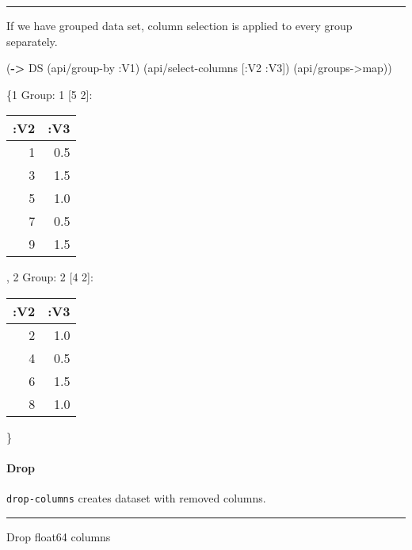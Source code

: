 \documentclass[]{article}
\newenvironment{Shaded}{\begin{snugshade}}{\end{snugshade}}
\newcommand{\KeywordTok}[1]{\textcolor[rgb]{0.13,0.29,0.53}{\textbf{#1}}}
\newcommand{\VariableTok}[1]{\textcolor[rgb]{0.00,0.00,0.00}{#1}}
\newcommand{\AttributeTok}[1]{\textcolor[rgb]{0.77,0.63,0.00}{#1}}
\newcommand{\NormalTok}[1]{#1}
\let\oldparagraph\paragraph
\renewcommand{\paragraph}[1]{\oldparagraph{#1}\mbox{}}
\begin{document}
\begin{center}\rule{0.5\linewidth}{0.5pt}\end{center}

If we have grouped data set, column selection is applied to every group
separately.

\begin{Shaded}
\begin{Highlighting}[]
\NormalTok{(}\KeywordTok{->}\NormalTok{ DS}
\NormalTok{    (api/group-by }\AttributeTok{:V1}\NormalTok{)}
\NormalTok{    (api/select-columns [}\AttributeTok{:V2} \AttributeTok{:V3}\NormalTok{])}
\NormalTok{    (api/groups->map))}
\end{Highlighting}
\end{Shaded}

\{1 Group: 1 {[}5 2{]}:

\begin{longtable}[]{@{}rr@{}}
\toprule
:V2 & :V3\tabularnewline
\midrule
\endhead
1 & 0.5\tabularnewline
3 & 1.5\tabularnewline
5 & 1.0\tabularnewline
7 & 0.5\tabularnewline
9 & 1.5\tabularnewline
\bottomrule
\end{longtable}

, 2 Group: 2 {[}4 2{]}:

\begin{longtable}[]{@{}rr@{}}
\toprule
:V2 & :V3\tabularnewline
\midrule
\endhead
2 & 1.0\tabularnewline
4 & 0.5\tabularnewline
6 & 1.5\tabularnewline
8 & 1.0\tabularnewline
\bottomrule
\end{longtable}

\}

\paragraph{Drop}\label{drop}

\texttt{drop-columns} creates dataset with removed columns.

\begin{center}\rule{0.5\linewidth}{0.5pt}\end{center}

Drop float64 columns

\begin{Shaded}
\end{Shaded}
\end{document}
